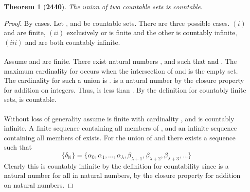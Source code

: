 \documentclass[preview]{standalone}
\newtheorem{theorem}{Theorem}
\begin{document}
\begin{theorem}[\textbf{2440}]
    The union of two countable sets is countable.
\end{theorem}

\begin{proof}
    By cases. Let , and \bm{$\Lambda$} be countable sets. 
    There are three possible cases. 
    $(i)$  and \bm{$\Lambda$} are finite, 
    $(ii)$ exclusively  or \bm{$\Lambda$} is finite and the other is countably infinite, 
    $(iii)$  and \bm{$\Lambda$} are both countably infinite.
    \\ \\
     Assume  and \bm{$\Lambda$} are finite. 
    There exist natural numbers \bm{$\lambda$}, and \bm{$\iota$} such that 
     and 
    \bm{$\big | \Lambda \big | = \iota$}. 
    The maximum cardinality for  
    occurs when the intersection of  and \bm{$\Lambda$} is 
    the empty set. The cardinality for such a union is \bm{$\lambda + \iota$}. 
    \bm{$\lambda + \iota$} is a natural number by the closure property for addition on integers. 
    Thus, \bm{$\lambda + \iota$} is less than . 
    By the definition for countably finite sets,  is countable. 
    \\ \\
     Without loss of generality assume  is finite with cardinality \bm{$\lambda$}, 
    and \bm{$\Lambda$} is countably infinite. 
    A finite sequence 
    \bm{$\big \{ \alpha_\iota \big \}$}
    containing all members of ,
    and an infinite sequence 
    containing all members of \bm{$\Lambda$}
    exists.
    For the union of  and \bm{$\Lambda$} 
    there exists a sequence \bm{$ \big \{ \delta \big \} $} such that
    \begin{equation*}
        \{ 
            \delta_\mathbb{N} 
        \} 
            = 
        \{\alpha_0, \alpha_1, \dots, \alpha_\lambda, 
        \beta_{\lambda+1}, \beta_{\lambda +2}, \beta_{\lambda + 3}, \dots \}
    \end{equation*}
    Clearly this is countably infinite by the definition for countability 
    since \bm{$\lambda + \chi$} is a natural number 
    for all \bm{$\chi$} in natural numbers, 
    by the closure property for addition on natural numbers. 

\end{proof}
\end{document}
